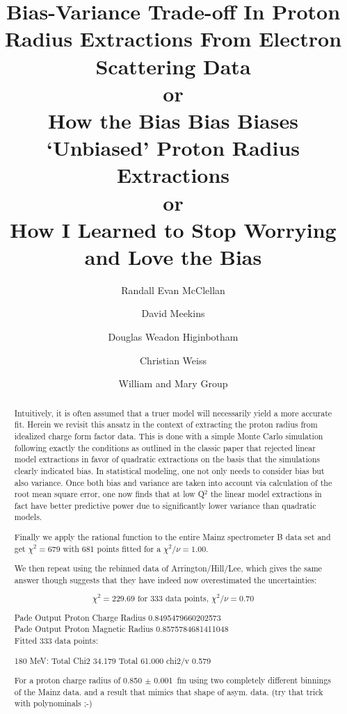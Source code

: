 \documentclass[10pt,aps,prc,twocolumn]{revtex4-1}
\begin{document}
\title{Bias-Variance Trade-off In Proton Radius Extractions From Electron Scattering Data \\
or \\
How the Bias Bias Biases `Unbiased' Proton Radius Extractions \\
or \\
How I Learned to Stop Worrying and Love the Bias}

\author{Randall Evan McClellan}
\author{David Meekins} 
\author{Douglas Weadon Higinbotham}
\author{Christian Weiss}
\author{William and Mary Group}

\begin{abstract}
Intuitively, it is often assumed that a truer model will necessarily yield a more accurate fit.
Herein we revisit this ansatz in the context of extracting the proton radius from idealized
charge form factor data.
This is done with a simple Monte Carlo simulation following exactly the conditions as outlined
in the classic paper that rejected linear model extractions in favor of quadratic extractions
on the basis that the simulations clearly indicated bias. In statistical modeling,
one not only needs to consider bias but also variance.
Once both bias and variance are taken into account via calculation of the root mean square error, 
one now finds that at low Q$^2$ the linear model extractions in fact have better predictive 
power due to significantly lower variance than quadratic models.

Finally we apply the rational function to the entire Mainz spectrometer B data set and get $\chi^2 = 679$ with 681 points fitted for a $\chi^2/\nu =  1.00$.   

We then repeat using the rebinned data of Arrington/Hill/Lee, which gives the same answer though
suggests that they have indeed now overestimated the uncertainties:

$$ \chi^2 = 229.69 \text{ for } 333 \text{ data points, } \chi^2/\nu = 0.70 $$

Pade Output Proton Charge Radius 0.8495479660202573 \\
Pade Output Proton Magnetic Radius 0.8575784681411048 \\
Fitted 333 data points:

180 MeV: Total Chi2 34.179 Total 61.000 chi2/v 0.579

For a proton charge radius of 0.850 $\pm$ 0.001~fm using two completely different binnings of the Mainz data.
and a result that mimics that shape of asym. data.
(try that trick with polynominals ;-)

\end{abstract}
\end{document}

